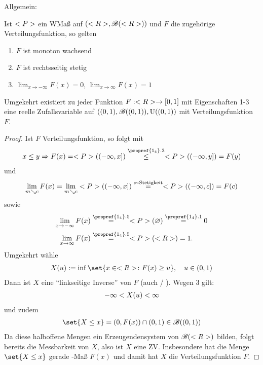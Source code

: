 Allgemein:

\begin{proposition}
	Ist $<P>$ ein WMaß auf $(<R>, \mathscr{B}(<R>))$ und $F$ die zugehörige Verteilungsfunktion, so gelten
	\begin{enumerate}
		\item $F$ ist monoton wachsend
		\item $F$ ist rechtsseitig stetig
		\item $\lim_{x\to -\infty} F(x) = 0$, $\lim_{x\to \infty} F(x) = 1$
	\end{enumerate}
	Umgekehrt existiert zu jeder Funktion $F: <R> \to [0,1]$ mit Eigenschaften 1-3 eine reelle Zufallsvariable auf $((0,1), \mathscr{B}((0,1)), \mathrm{U}((0,1))$ mit Verteilungsfunktion $F$.
\end{proposition}

\begin{proof}
	Ist $F$ Verteilungsfunktion, so folgt mit 
	\begin{align}
		 x \le y \Rightarrow F(x) = \probp((-\infty,x]) \overset{\propref{1_4}.3}{\le} \probp((-\infty,y]) = F(y)\notag
	\end{align}
	und
	\begin{align}
		\lim_{m \searrow c} F(x) = \lim_{m \searrow c} <P>((-\infty, x]) \overset{\sigma\text{-Stetigkeit}}{=} <P>((-\infty, c]) = F(c)\notag
	\end{align}
	sowie
	\begin{align}
		\lim_{x\to -\infty} F(x) &\overset{\propref{1_4}.5}{=} \probp(\emptyset) \overset{\propref{1_4}.1}{=} 0\notag\\
		\lim_{x\to \infty} F(x) &\overset{\propref{1_4}.5}{=} \probp(\R) = 1.\notag\\
	\end{align}
	Umgekehrt wähle
	\begin{align}
		X(u) := \inf\set{x \in \R \colon F(x) \ge u}, \quad u \in (0,1)\notag\\
	\end{align}
	Dann ist $X$ eine ``linkseitige Inverse'' von $F$ (auch  / ).
	Wegen 3 gilt:
	\begin{align}
		-\infty < X(u) < \infty\notag
	\end{align}
	und zudem
	\begin{align}
		\set{X \le x} = (0, F(x)) \cap (0,1) \in \borel((0,1))\notag
	\end{align}
	Da diese halboffene Mengen ein Erzeugendensystem von $\mathscr{B}(<R>)$ bilden, folgt bereits die Messbarkeit von $X$, also ist $X$ eine ZV. Insbesondere hat die Menge $\set{X \le x}$ gerade -Maß $F(x)$ und damit hat $X$ die Verteilungsfunktion $F$.
\end{proof}

